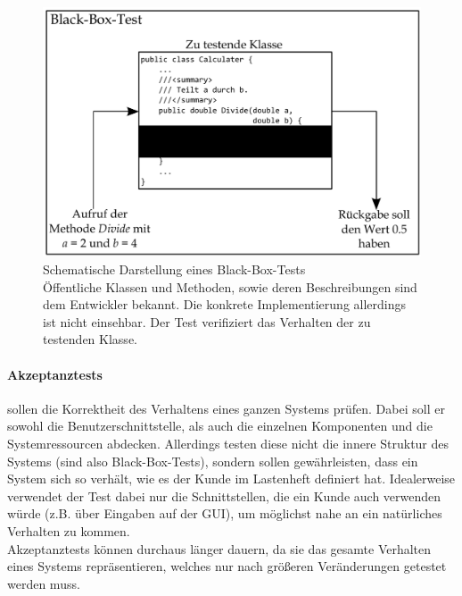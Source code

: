 \begin{figure}[h]
\centering
\includegraphics[width=0.8\linewidth]{./images/Kapitel_Einleitung/Black_Box_Test.pdf}
\caption[Schematische Darstellung eines Black-Box-Tests]{Schematische Darstellung eines Black-Box-Tests\\Öffentliche Klassen und Methoden, sowie deren Beschreibungen sind dem Entwickler bekannt. Die konkrete Implementierung allerdings ist nicht einsehbar. Der Test verifiziert das Verhalten der zu testenden Klasse.}
\label{fig:Black_Box_Test}
\end{figure}

\clearpage

\paragraph{Akzeptanztests} sollen die Korrektheit des Verhaltens eines ganzen Systems prüfen. Dabei soll er sowohl die Benutzerschnittstelle, als auch die einzelnen Komponenten und die Systemressourcen abdecken. Allerdings testen diese nicht die innere Struktur des Systems (sind also Black-Box-Tests), sondern sollen gewährleisten, dass ein System sich so verhält, wie es der Kunde im Lastenheft definiert hat. Idealerweise verwendet der Test dabei nur die Schnittstellen, die ein Kunde auch verwenden würde (z.B. über Eingaben auf der GUI), um möglichst nahe an ein natürliches Verhalten zu kommen.\\
Akzeptanztests können durchaus länger dauern, da sie das gesamte Verhalten eines Systems repräsentieren, welches nur nach größeren Veränderungen getestet werden muss.

